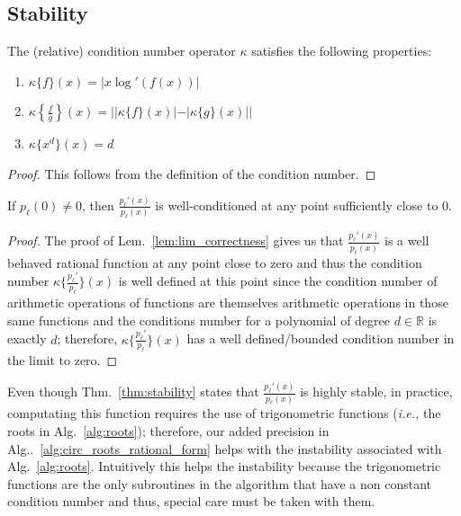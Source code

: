 \documentclass[runningheads]{llncs}
\begin{document}
\subsection{Stability}

\begin{lemma}
The (relative) condition number operator $\kappa$ satisfies the following properties:
\begin{enumerate}
  \item $\kappa\{f\} (x) = |x \log'(f(x)) |$
  \item $\kappa \left\{\frac{f}{g}\right\} (x)= ||\kappa\{ f\} (x)| - |\kappa\{ g\} (x)||$
    \item $\kappa \{x^ d \} (x)= d$
\end{enumerate}
\end{lemma}
\begin{proof}
This follows from the definition of the condition number.
\end{proof}
\begin{theorem}\label{thm:stability}
If $p_\ell(0)\neq 0$, then $\frac{p_{\ell}'(x)}{p_{\ell}(x)}$ is well-conditioned at any point sufficiently close to 0.
\end{theorem}
\begin{proof}
  The proof of Lem.~\ref{lem:lim_correctness} gives us that $\frac{p_{\ell}'(x)}{p_{\ell}(x)}$ is a well behaved rational function at any point close to zero and thus the condition number $\kappa\{\frac{p_{\ell}'}{p_{\ell}}\}(x)$ is well defined at this point since the condition number of arithmetic operations of functions are themselves arithmetic operations in those same functions and the conditions number for a polynomial of degree $d \in \mathbb{R}$ is exactly $d$; therefore, $\kappa\{\frac{p_{\ell}'}{p_{\ell}}\}(x)$ has a well defined/bounded condition number in the limit to zero.
\end{proof}

\begin{remark}
Even though Thm.~\ref{thm:stability} states that $\frac{p_{\ell}'(x)}{p_{\ell}(x)}$ is highly stable, in practice, computating this function requires the use of trigonometric functions (\emph{i.e.,} the roots in Alg.~\ref{alg:roots}); therefore, our added precision in Alg..~\ref{alg:circ_roots_rational_form} helps with the instability associated with Alg.~\ref{alg:roots}. Intuitively this helps the instability because the trigonometric functions are the only subroutines in the algorithm that have a non constant condition number and thus, special care must be taken with them.
\end{remark}
\end{document}
